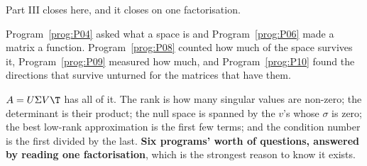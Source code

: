 \begin{fr}
Part III closes here, and it closes on one factorisation.

Program~\ref{prog:P04} asked what a space is and Program~\ref{prog:P06} made a
matrix a function. Program~\ref{prog:P08} counted how much of the space
survives it, Program~\ref{prog:P09} measured how much, and
Program~\ref{prog:P10} found the directions that survive unturned \dash{} for
the matrices that have them.

$A = U\Sigma V\T$ has all of it. The rank is how many singular values are
non-zero; the determinant is their product; the null space is spanned by the
$v$'s whose $\sigma$ is zero; the best low-rank approximation is the first few
terms; and the condition number is the first divided by the last.
\textbf{Six programs' worth of questions, answered by reading one
factorisation}, which is the strongest reason to know it exists.
\end{fr}

